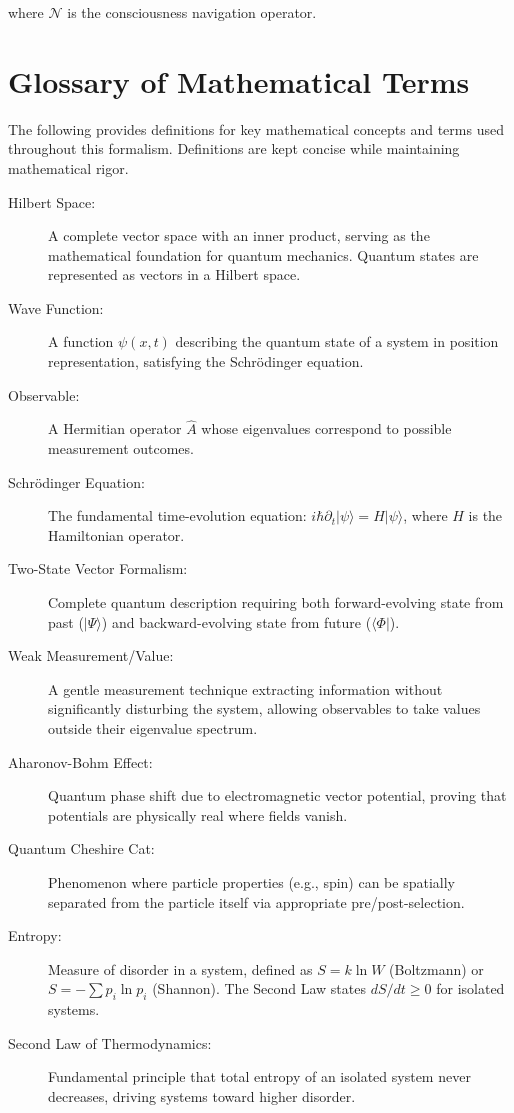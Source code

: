 \documentclass[12pt,a4paper]{article}
\theoremstyle{definition}
\begin{document}
where $\mathcal{N}$ is the consciousness navigation operator.

\section{Glossary of Mathematical Terms}

The following provides definitions for key mathematical concepts and terms used throughout this formalism. Definitions are kept concise while maintaining mathematical rigor.

\begin{description}
    \item[Hilbert Space:] A complete vector space with an inner product, serving as the mathematical foundation for quantum mechanics. Quantum states are represented as vectors in a Hilbert space.
    \item[Wave Function:] A function $\psi(x,t)$ describing the quantum state of a system in position representation, satisfying the Schrödinger equation.
    \item[Observable:] A Hermitian operator $\hat{A}$ whose eigenvalues correspond to possible measurement outcomes.
    \item[Schrödinger Equation:] The fundamental time-evolution equation: $i\hbar \partial_t |\psi\rangle = H |\psi\rangle$, where $H$ is the Hamiltonian operator.
    \item[Two-State Vector Formalism:] Complete quantum description requiring both forward-evolving state from past ($|\Psi\rangle$) and backward-evolving state from future ($\langle\Phi|$).
    \item[Weak Measurement/Value:] A gentle measurement technique extracting information without significantly disturbing the system, allowing observables to take values outside their eigenvalue spectrum.
    \item[Aharonov-Bohm Effect:] Quantum phase shift due to electromagnetic vector potential, proving that potentials are physically real where fields vanish.
    \item[Quantum Cheshire Cat:] Phenomenon where particle properties (e.g., spin) can be spatially separated from the particle itself via appropriate pre/post-selection.
    \item[Entropy:] Measure of disorder in a system, defined as $S = k \ln W$ (Boltzmann) or $S = -\sum p_i \ln p_i$ (Shannon). The Second Law states $dS/dt \geq 0$ for isolated systems.
    \item[Second Law of Thermodynamics:] Fundamental principle that total entropy of an isolated system never decreases, driving systems toward higher disorder.

\end{description}
\end{document}
